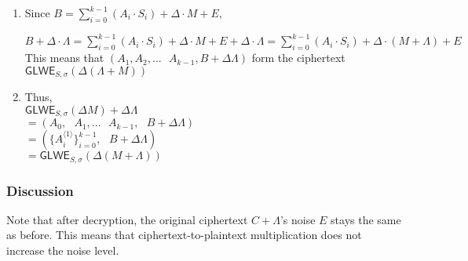 \begin{myproof}

\begin{enumerate}
\item Since $B = \sum\limits_{i=0}^{k-1}{(A_i \cdot S_i)} + \Delta \cdot M + E$,

$B + \Delta \cdot \Lambda = \sum\limits_{i=0}^{k-1}{(A_i \cdot S_i)} + \Delta \cdot M + E + \Delta \cdot \Lambda = \sum\limits_{i=0}^{k-1}{(A_i \cdot S_i)} + \Delta \cdot (M + \Lambda) + E$  \\

This means that $(A_1, A_2, ... \text{ } A_{k-1}
, B + \Delta \Lambda)$ form the ciphertext $\textsf{GLWE}_{S, \sigma}(\Delta (\Lambda + M))$
\item Thus, \\
$\textsf{GLWE}_{S, \sigma}(\Delta M) + \Delta\Lambda$ \\
$ = (A_0, \text { } A_1, ... \text{ } A_{k-1}, \text { } B + \Delta \Lambda)$ \\
$ = (\{A_i^{\langle 1 \rangle}\}_{i=0}^{k-1}, \text { } B + \Delta \Lambda)$ \\
$= \textsf{GLWE}_{S, \sigma}(\Delta (M + \Lambda))$

\end{enumerate}

\end{myproof}


\subsubsection{Discussion}

 Note that after decryption, the original ciphertext $C +\Lambda$'s noise $E$ stays the same as before. This means that ciphertext-to-plaintext multiplication does not increase the noise level.